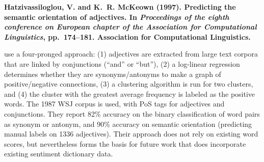 {\noindent \textbf{Hatzivassiloglou, V. and K.~R. McKeown (1997).
Predicting the semantic orientation of adjectives.
In {\em Proceedings of the eighth conference on European chapter of
  the Association for Computational Linguistics}, pp.\  174--181. Association
  for Computational Linguistics.}

\noindent \cite{hatzivassiloglou1997predicting} use a four-pronged approach: (1) adjectives are extracted from large text corpora that are linked by conjunctions (``and'' or ``but''), (2) a log-linear regression determines whether they are synonyms/antonyms to make a graph of positive/negative connections, (3) a clustering algorithm is run for two clusters, and (4) the cluster with the greatest average frequency is labeled as the positive words.
The 1987 WSJ corpus is used, with PoS tags for adjectives and conjunctions.
They report 82\% accuracy on the binary classification of word pairs as synonym or antonym, and 90\% accuracy on semantic orientation (predicting manual labels on 1336 adjectives).
Their approach does not rely on existing word scores, but nevertheless forms the basis for future work that does incorporate existing sentiment dictionary data.\\




}
